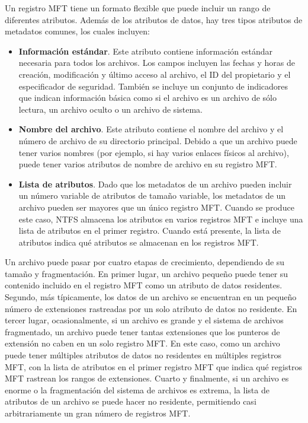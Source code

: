 \documentclass[10pt]{book}
\begin{document}
Un registro MFT tiene un formato flexible que puede incluir un rango de diferentes atributos. Además de los atributos de datos, hay tres tipos atributos de metadatos comunes, los cuales incluyen:
\begin{itemize}
\item \textbf{Información estándar}. Este atributo contiene información estándar necesaria para todos los archivos. Los campos incluyen las fechas y horas de creación, modificación y último acceso al archivo, el ID del propietario y el especificador de seguridad. También se incluye un conjunto de indicadores que indican información básica como si el archivo es un archivo de sólo lectura, un archivo oculto o un archivo de sistema.
\item \textbf{Nombre del archivo}. Este atributo contiene el nombre del archivo y el número de archivo de su directorio principal. Debido a que un archivo puede tener varios nombres (por ejemplo, si hay varios enlaces físicos al archivo), puede tener varios atributos de nombre de archivo en su registro MFT.
\item \textbf{Lista de atributos}. Dado que los metadatos de un archivo pueden incluir un número variable de atributos de tamaño variable, los metadatos de un archivo pueden ser mayores que un único registro MFT. Cuando se produce este caso, NTFS almacena los atributos en varios registros MFT e incluye una lista de atributos en el primer registro. Cuando está presente, la lista de atributos indica qué atributos se almacenan en los registros MFT.
\end{itemize}

Un archivo puede pasar por cuatro etapas de crecimiento, dependiendo de su tamaño y fragmentación. En primer lugar, un archivo pequeño puede tener su contenido incluido en el registro MFT como un atributo de datos residentes. Segundo, más típicamente, los datos de un archivo se encuentran en un pequeño número de extensiones rastreadas por un solo atributo de datos no residente. En tercer lugar, ocasionalmente, si un archivo es grande y el sistema de archivos fragmentado, un archivo puede tener tantas extensiones que los punteros de extensión no caben en un solo registro MFT. En este caso, como un archivo puede tener múltiples atributos de datos no residentes en múltiples registros MFT, con la lista de atributos en el primer registro MFT que indica qué registros MFT rastrean los rangos de extensiones. Cuarto y finalmente, si un archivo es enorme o la fragmentación del sistema de archivos es extrema, la lista de atributos de un archivo se puede hacer no residente, permitiendo casi arbitrariamente un gran número de registros MFT.
\end{document}

